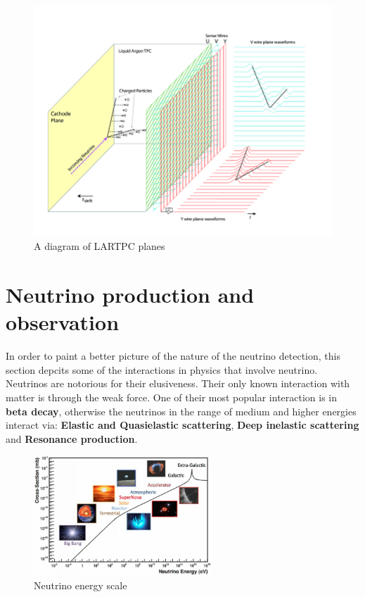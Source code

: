 \begin{figure}[H]
\centering
\includegraphics[width=.6\textwidth]{figures/chapter6/Operational-principle-of-the-MicroBooNE-LArTPC.png}
\caption{A diagram of LARTPC planes \cite{microboone}}
\label{fig:lartpc-grids}
\end{figure}

\section{Neutrino production and observation}

In order to paint a better picture of the nature of the neutrino detection, this section depcits some of the interactions in physics that involve neutrino.
Neutrinos are notorious for their elusiveness. Their only known interaction with matter is through the weak force.
One of their most popular interaction is in \textbf{beta decay}, otherwise the neutrinos in the range of medium and higher energies interact via: \textbf{Elastic and Quasielastic scattering}, \textbf{Deep inelastic scattering} and \textbf{Resonance production}.

\begin{figure}[H]
\centering
\includegraphics[width=0.6\textwidth]{figures/chapter6/neutrino-energy-scale.jpg}
\caption{Neutrino energy scale \cite{RevModPhys.84.1307}}
\label{fig:neutrino-energy}
\end{figure}

